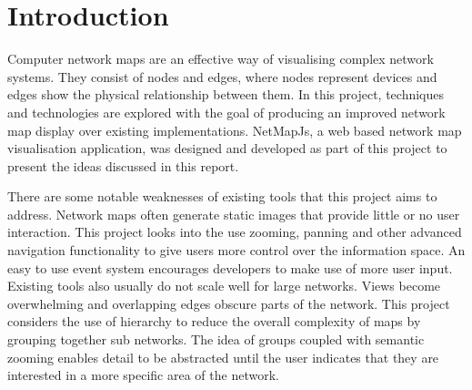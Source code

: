 \documentclass[11pt, a4paper]{article}
\begin{document}
\date{26/10/2011}

\tableofcontents

\newpage

\abs{
}

\section{Introduction}
\label{sec:introduction}


Computer network maps are an effective way of visualising complex network
systems. They consist of nodes and edges, where nodes represent devices and edges
show the physical relationship between them. In this project, techniques and
technologies are explored with the goal of producing an improved network map
display over existing implementations. NetMapJs, a web based network map
visualisation application, was designed and developed as part of this project to
present the ideas discussed in this report.

 
There are some notable weaknesses of existing tools that this project aims to
address. Network maps often generate static images that provide little or no
user interaction. This project looks into the use zooming, panning and other
advanced navigation functionality to give users more control over the
information space. An easy to use event system encourages developers to make use
of more user input. Existing tools also usually do not scale well for large
networks. Views become overwhelming and overlapping edges obscure parts of the
network. This project considers the use of hierarchy to reduce the overall
complexity of maps by grouping together sub networks. The idea of groups coupled
with semantic zooming enables detail to be abstracted until the user indicates
that they are interested in a more specific area of the network.
\end{document}

